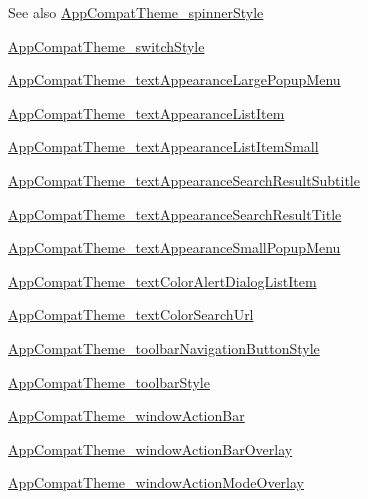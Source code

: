 \begin{DoxySeeAlso}{See also}
\hyperlink{classproject4_1_1xaria_1_1R_1_1styleable_a918d109191c529fed6f95201986203af}{App\+Compat\+Theme\+\_\+spinner\+Style} 

\hyperlink{classproject4_1_1xaria_1_1R_1_1styleable_a33d0593c2cd3f80d60995b4580bed2db}{App\+Compat\+Theme\+\_\+switch\+Style} 

\hyperlink{classproject4_1_1xaria_1_1R_1_1styleable_a0f3ef906935af92b8a0555a151cdb0a4}{App\+Compat\+Theme\+\_\+text\+Appearance\+Large\+Popup\+Menu} 

\hyperlink{classproject4_1_1xaria_1_1R_1_1styleable_aa6c67f0600a5d8caedaf5e80e8a4acb7}{App\+Compat\+Theme\+\_\+text\+Appearance\+List\+Item} 

\hyperlink{classproject4_1_1xaria_1_1R_1_1styleable_adc238aae83f2e253317ab04cf7aa7ef5}{App\+Compat\+Theme\+\_\+text\+Appearance\+List\+Item\+Small} 

\hyperlink{classproject4_1_1xaria_1_1R_1_1styleable_ac77446b89989c34ed15642f5e5860c71}{App\+Compat\+Theme\+\_\+text\+Appearance\+Search\+Result\+Subtitle} 

\hyperlink{classproject4_1_1xaria_1_1R_1_1styleable_a489601ae9406c0857de192f2c579d01f}{App\+Compat\+Theme\+\_\+text\+Appearance\+Search\+Result\+Title} 

\hyperlink{classproject4_1_1xaria_1_1R_1_1styleable_a0b2edd58e797e1a0b12ec98975f7b355}{App\+Compat\+Theme\+\_\+text\+Appearance\+Small\+Popup\+Menu} 

\hyperlink{classproject4_1_1xaria_1_1R_1_1styleable_aea2ca8637844e7e15e92fc8a9341e92d}{App\+Compat\+Theme\+\_\+text\+Color\+Alert\+Dialog\+List\+Item} 

\hyperlink{classproject4_1_1xaria_1_1R_1_1styleable_aabbc8b91c6cabb8ea2973b309f65c63c}{App\+Compat\+Theme\+\_\+text\+Color\+Search\+Url} 

\hyperlink{classproject4_1_1xaria_1_1R_1_1styleable_ae547053c95c192e4f25178aa4530ee6a}{App\+Compat\+Theme\+\_\+toolbar\+Navigation\+Button\+Style} 

\hyperlink{classproject4_1_1xaria_1_1R_1_1styleable_a77e2df5acbe372a663d1ccbcf26269ee}{App\+Compat\+Theme\+\_\+toolbar\+Style} 

\hyperlink{classproject4_1_1xaria_1_1R_1_1styleable_a63da97bf5664857a9e2d0b8f5ba65d80}{App\+Compat\+Theme\+\_\+window\+Action\+Bar} 

\hyperlink{classproject4_1_1xaria_1_1R_1_1styleable_a06afb482b15287963396e764ae69b472}{App\+Compat\+Theme\+\_\+window\+Action\+Bar\+Overlay} 

\hyperlink{classproject4_1_1xaria_1_1R_1_1styleable_a90154482a964f6451f06f63075d14158}{App\+Compat\+Theme\+\_\+window\+Action\+Mode\+Overlay} 


\end{DoxySeeAlso}
